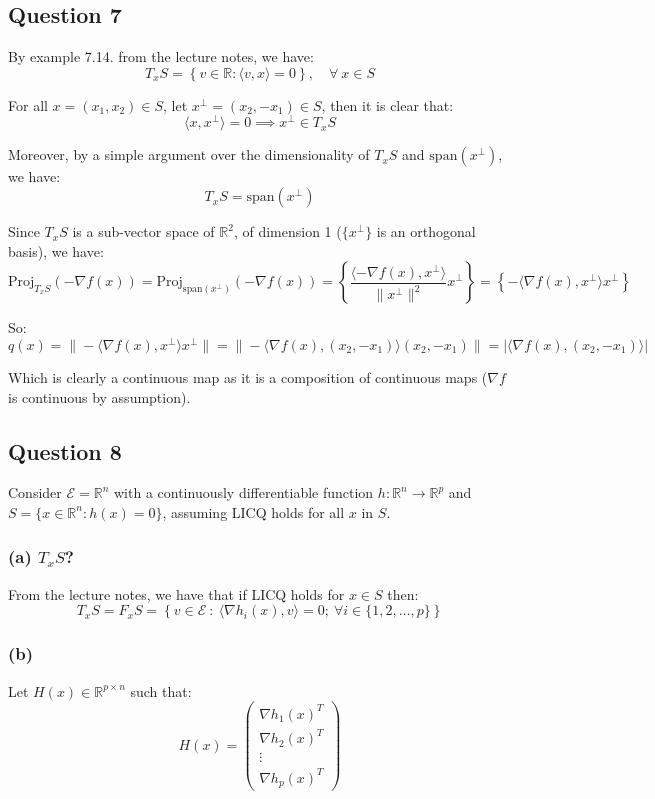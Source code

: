 \documentclass[12p]{article}
\newcommand*{\es}{\mathcal{E}}
\begin{document}
\subsection*{Question 7} \hfil\par

By example 7.14. from the lecture notes, we have:
\[
    T_xS=\left\{v\in \mathbb{R}: \langle v,x \rangle =0\right\}, \quad \forall\ x\in S
\]

For all \(x=(x_1, x_2)\in S\), let \(x^\perp=(x_2, -x_1)\in S\), then it is clear that:
\[
    \langle x, x^\perp\rangle =0\implies x^\perp\in T_xS
\]

Moreover, by a simple argument over the dimensionality of \(T_xS\) and \(\text{span}(x^\perp)\), we have:
\[
    T_xS= \text{span}(x^\perp)
\]

Since \(T_xS\) is a sub-vector space of \(\mathbb{R}^2\), of dimension 1 (\(\{x^\perp\}\) is an orthogonal basis), we have:
\[
    \text{Proj}_{T_xS}(-\nabla f(x))=\text{Proj}_{\text{span}(x^\perp)}(-\nabla f(x))=\left\{\frac{\langle -\nabla f(x), x^\perp\rangle}{\|x^\perp\|^2}x^\perp\right\}=\left\{-\langle \nabla f(x), x^\perp\rangle x^\perp\right\}
\]

So:
\[
  q(x)=\|- \langle \nabla f(x), x^\perp\rangle x^\perp\|=\|- \langle \nabla f(x), (x_2, -x_1)\rangle (x_2, -x_1)\|=|\langle \nabla f(x), (x_2, -x_1)\rangle|
\]

Which is clearly a continuous map as it is a composition of continuous maps (\(\nabla f\) is continuous by assumption).

\subsection*{Question 8} \hfil\par

Consider \( \es = \mathbb{R}^n \) with a continuously differentiable function \( h: \mathbb{R}^n \rightarrow \mathbb{R}^p \) and \( S = \{x \in \mathbb{R}^n : h(x) = 0\} \), assuming LICQ holds for all \( x \) in \( S \).

\subsubsection*{(a) \(T_xS\)?}\hfil\par
From the lecture notes, we have that if LICQ holds for \(x\in S\) then:
\[
  T_xS=F_xS=\left\{v\in \es \ : \ \langle\nabla h_i(x),v\rangle=0;\ \forall i\in\{1,2,\dots,p\}\right\}  
\]
\subsubsection*{(b)}\hfil\par
Let \(H(x)\in\mathbb{R}^{p\times n}\) such that:
\[
  H(x)=\begin{pmatrix}
    \nabla h_1(x)^T\\
    \nabla h_2(x)^T\\
    \vdots\\
    \nabla h_p(x)^T  
    \end{pmatrix}
\]
\end{document}

